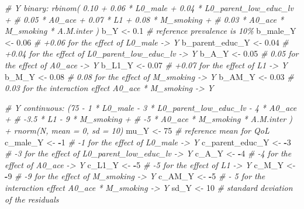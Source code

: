 \documentclass[
]{book}
\newenvironment{Shaded}{\begin{snugshade}}{\end{snugshade}}
\newcommand{\CommentTok}[1]{\textcolor[rgb]{0.56,0.35,0.01}{\textit{#1}}}
\newcommand{\DecValTok}[1]{\textcolor[rgb]{0.00,0.00,0.81}{#1}}
\newcommand{\FloatTok}[1]{\textcolor[rgb]{0.00,0.00,0.81}{#1}}
\newcommand{\NormalTok}[1]{#1}
\newcommand{\OtherTok}[1]{\textcolor[rgb]{0.56,0.35,0.01}{#1}}
\newcommand{\SpecialCharTok}[1]{\textcolor[rgb]{0.81,0.36,0.00}{\textbf{#1}}}
\begin{document}
\begin{Shaded}
\begin{Highlighting}[]
\CommentTok{\# Y binary: rbinom( 0.10 + 0.06 * L0\_male + 0.04 * L0\_parent\_low\_educ\_lv + }
\CommentTok{\#                   0.05 * A0\_ace + 0.07 * L1 + 0.08 * M\_smoking +}
\CommentTok{\#                   0.03 * A0\_ace * M\_smoking * A.M.inter ) }
\NormalTok{b\_Y }\OtherTok{\textless{}{-}} \FloatTok{0.1} \CommentTok{\# reference prevalence is 10\%}
\NormalTok{b\_male\_Y }\OtherTok{\textless{}{-}} \FloatTok{0.06} \CommentTok{\# +0.06 for the effect of L0\_male {-}\textgreater{} Y}
\NormalTok{b\_parent\_educ\_Y }\OtherTok{\textless{}{-}} \FloatTok{0.04} \CommentTok{\# +0.04 for the effect of L0\_parent\_low\_educ\_lv {-}\textgreater{} Y}
\NormalTok{b\_A\_Y }\OtherTok{\textless{}{-}} \FloatTok{0.05} \CommentTok{\# 0.05 for the effect of A0\_ace {-}\textgreater{} Y}
\NormalTok{b\_L1\_Y }\OtherTok{\textless{}{-}} \FloatTok{0.07} \CommentTok{\# +0.07 for the effect of L1 {-}\textgreater{} Y}
\NormalTok{b\_M\_Y }\OtherTok{\textless{}{-}} \FloatTok{0.08} \CommentTok{\# 0.08 for the effect of M\_smoking {-}\textgreater{} Y}
\NormalTok{b\_AM\_Y }\OtherTok{\textless{}{-}} \FloatTok{0.03} \CommentTok{\# 0.03 for the interaction effect A0\_ace * M\_smoking {-}\textgreater{} Y}

\CommentTok{\# Y continuous: (75 {-} 1 * L0\_male {-} 3 * L0\_parent\_low\_educ\_lv {-} 4 * A0\_ace +}
\CommentTok{\#                {-}3.5 * L1 {-} 9 * M\_smoking + }
\CommentTok{\#                {-}5 * A0\_ace * M\_smoking * A.M.inter ) + rnorm(N, mean = 0, sd = 10)}
\NormalTok{mu\_Y }\OtherTok{\textless{}{-}} \DecValTok{75} \CommentTok{\# reference mean for QoL}
\NormalTok{c\_male\_Y }\OtherTok{\textless{}{-}} \SpecialCharTok{{-}}\DecValTok{1} \CommentTok{\# {-}1 for the effect of L0\_male {-}\textgreater{} Y}
\NormalTok{c\_parent\_educ\_Y }\OtherTok{\textless{}{-}} \SpecialCharTok{{-}}\DecValTok{3} \CommentTok{\# {-}3 for the effect of L0\_parent\_low\_educ\_lv {-}\textgreater{} Y}
\NormalTok{c\_A\_Y }\OtherTok{\textless{}{-}} \SpecialCharTok{{-}}\DecValTok{4} \CommentTok{\# {-}4 for the effect of A0\_ace {-}\textgreater{} Y}
\NormalTok{c\_L1\_Y }\OtherTok{\textless{}{-}} \SpecialCharTok{{-}}\DecValTok{5} \CommentTok{\# {-}5 for the effect of L1 {-}\textgreater{} Y}
\NormalTok{c\_M\_Y }\OtherTok{\textless{}{-}} \SpecialCharTok{{-}}\DecValTok{9} \CommentTok{\# {-}9 for the effect of M\_smoking {-}\textgreater{} Y}
\NormalTok{c\_AM\_Y }\OtherTok{\textless{}{-}} \SpecialCharTok{{-}}\DecValTok{5}  \CommentTok{\# {-} 5 for the interaction effect A0\_ace * M\_smoking  {-}\textgreater{} Y}
\NormalTok{sd\_Y }\OtherTok{\textless{}{-}} \DecValTok{10} \CommentTok{\# standard deviation of the residuals}


\end{Highlighting}
\end{Shaded}
\end{document}
